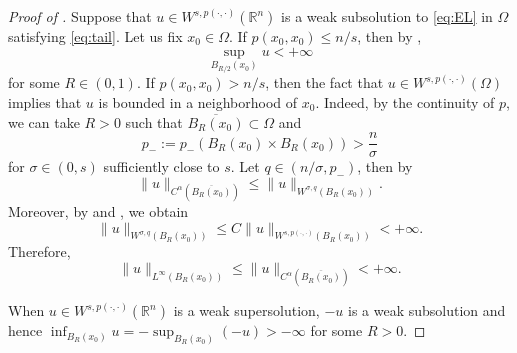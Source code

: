 \documentclass[11pt]{amsart}
\theoremstyle{plain}
\theoremstyle{definition}
\numberwithin{equation}{section}
\begin{document}
\begin{proof} [Proof of ]
Suppose that $u \in W^{s, p(\cdot,\cdot)}(\mathbb{R}^n)$ is a weak subsolution to \eqref{eq:EL} in $\Omega$ satisfying \eqref{eq:tail}. Let us fix $x_0 \in \Omega$. If $p(x_0, x_0) \leq n/s$, then by ,
\begin{equation*}
\sup_{B_{R/2}(x_0)} u < +\infty
\end{equation*}
for some $R \in (0,1)$. If $p(x_0, x_0) > n/s$, then the fact that $u \in W^{s, p(\cdot,\cdot)}(\Omega)$ implies that $u$ is bounded in a neighborhood of $x_0$. Indeed, by the continuity of $p$, we can take $R > 0$ such that $\overline{B_{R}(x_0)} \subset \Omega$ and
\begin{equation*}
p_- := p_-(B_{R}(x_0) \times B_{R}(x_0)) > \frac{n}{\sigma}
\end{equation*}
for $\sigma \in (0, s)$ sufficiently close to $s$. Let $q \in (n/\sigma, p_-)$, then by 
\begin{equation*}
\|u\|_{C^\alpha(\overline{B_{R}(x_0)})} \leq \|u\|_{W^{\sigma, q}(B_{R}(x_0))}.
\end{equation*}
Moreover, by  and , we obtain
\begin{equation*}
\|u\|_{W^{\sigma, q}(B_{R}(x_0))} \leq C \|u\|_{W^{s, p(\cdot,\cdot)}(B_{R}(x_0))} < +\infty.
\end{equation*}
Therefore, 
\begin{equation*}
\|u\|_{L^\infty(B_{R}(x_0))} \leq \|u\|_{C^\alpha(\overline{B_{R}(x_0)})} <+\infty.
\end{equation*}

When $u \in W^{s, p(\cdot,\cdot)}(\mathbb{R}^n)$ is a weak supersolution, $-u$ is a weak subsolution and hence $\inf_{B_{R}(x_0)} u = -\sup_{B_{R}(x_0)} (-u) > -\infty$ for some $R > 0$.
\end{proof}
\end{document}
